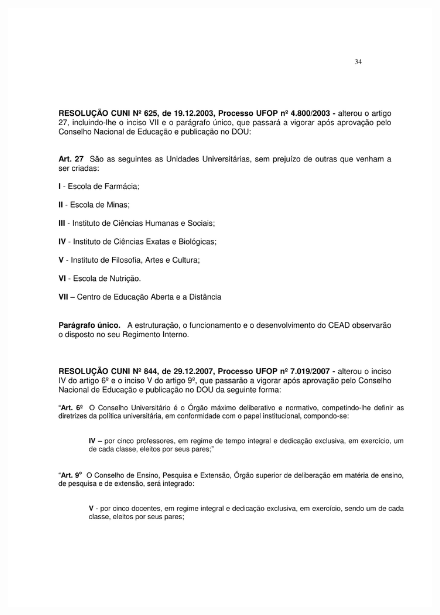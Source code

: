 \begin{figure}[p]
	\centering 
	\includegraphics[scale=0.7]{capitulos/resolucoes/cuni414/cuni414-34.pdf}
\end{figure} \pagebreak


